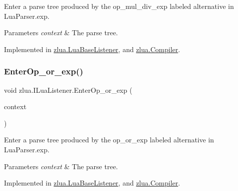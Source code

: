 Enter a parse tree produced by the {\ttfamily op\+\_\+mul\+\_\+div\+\_\+exp} labeled alternative in Lua\+Parser.\+exp. 


\begin{DoxyParams}{Parameters}
{\em context} & The parse tree.\\
\hline
\end{DoxyParams}


Implemented in \mbox{\hyperlink{classzlua_1_1_lua_base_listener_a6c6043921201d7aad886fc07f059c3e8}{zlua.\+Lua\+Base\+Listener}}, and \mbox{\hyperlink{classzlua_1_1_compiler_ac79e4b2008ccb00f7209a5dbc9ce7362}{zlua.\+Compiler}}.

\mbox{\label{interfacezlua_1_1_i_lua_listener_a51c92b24a1ae3217599c08d098f351e8}} 
\subsubsection{\texorpdfstring{Enter\+Op\+\_\+or\+\_\+exp()}{EnterOp\_or\_exp()}}
{\footnotesize\ttfamily void zlua.\+I\+Lua\+Listener.\+Enter\+Op\+\_\+or\+\_\+exp (\begin{DoxyParamCaption}\item[{\mbox{[}\+Not\+Null\mbox{]} \mbox{\hyperlink{classzlua_1_1_lua_parser_1_1_op__or__exp_context}{Lua\+Parser.\+Op\+\_\+or\+\_\+exp\+Context}}}]{context }\end{DoxyParamCaption})}



Enter a parse tree produced by the {\ttfamily op\+\_\+or\+\_\+exp} labeled alternative in Lua\+Parser.\+exp. 


\begin{DoxyParams}{Parameters}
{\em context} & The parse tree.\\
\hline
\end{DoxyParams}


Implemented in \mbox{\hyperlink{classzlua_1_1_lua_base_listener_ad05798f5b17c22a225fe160a5230d82c}{zlua.\+Lua\+Base\+Listener}}, and \mbox{\hyperlink{classzlua_1_1_compiler_a00586a6ef587aa5305c9ab8071c15d5a}{zlua.\+Compiler}}.

\mbox{\label{interfacezlua_1_1_i_lua_listener_ab264dde9b798933c740a470090b2db94}} 
